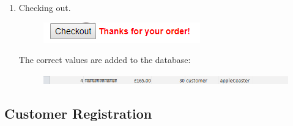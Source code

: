 ﻿\documentclass{article}
\begin{document}
\begin{enumerate}
        \item Checking out.
        \begin{figure}[H]
            \includegraphics{testing/cart2.png}
            \centering
        \end{figure}
        The correct values are added to the database:
        \begin{figure}[H]
            \includegraphics{testing/cart3.png}
            \centering
        \end{figure}
    \end{enumerate}
    \newpage
    \subsection{Customer Registration}
\end{document}
